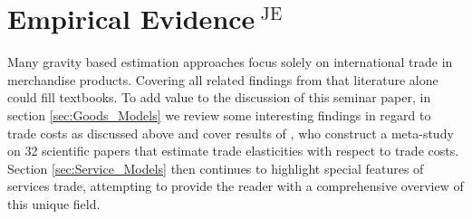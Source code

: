 \section[Empirical Evidence]{Empirical Evidence$^{\text{ JE}}$}
\label{sec:Empirical_evidence}













Many gravity based estimation approaches focus solely on international trade in merchandise products. Covering all related findings from that literature alone could fill textbooks. To add value to the discussion of this seminar paper, in section \ref{sec:Goods_Models} we review some interesting findings in regard to trade costs as discussed above and cover results of \textcite[p. 163-166]{cookbook}, who construct a meta-study on 32 scientific papers that estimate trade elasticities with respect to trade costs. Section \ref{sec:Service_Models} then continues to highlight special features of services trade, attempting to provide the reader with a comprehensive overview of this unique field.














